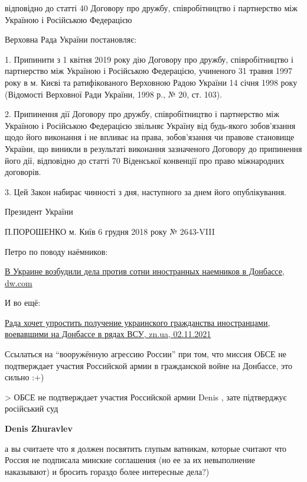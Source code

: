 \begin{itemize}
\begin{itemize}
відповідно до статті 40 Договору про дружбу, співробітництво і партнерство між
Україною і Російською Федерацією

Верховна Рада України постановляє:

1. Припинити з 1 квітня 2019 року дію Договору про дружбу, співробітництво і
партнерство між Україною і Російською Федерацією, учиненого 31 травня 1997 року
в м. Києві та ратифікованого Верховною Радою України 14 січня 1998 року
(Відомості Верховної Ради України, 1998 р., № 20, ст. 103).

2. Припинення дії Договору про дружбу, співробітництво і партнерство між
Україною і Російською Федерацією звільняє Україну від будь-якого зобов’язання
щодо його виконання і не впливає на права, зобов’язання чи правове становище
України, що виникли в результаті виконання зазначеного Договору до припинення
його дії, відповідно до статті 70 Віденської конвенції про право міжнародних
договорів.

3. Цей Закон набирає чинності з дня, наступного за днем його опублікування.

Президент України

П.ПОРОШЕНКО
м. Київ
6 грудня 2018 року
№ 2643-VIII

Петро по поводу наёмников:

\href{https://www.dw.com/ru/v-ukraine-vozbudili-dela-protiv-sotni-naemnikov-v-donbasse/a-54491064}{%
В Украине возбудили дела против сотни иностранных наемников в Донбассе, dw.com%
}


И во ещё:

\href{https://zn.ua/POLITICS/rada-khochet-uprostit-poluchenie-ukrainskoho-hrazhdanstva-dlja-inostrantsev-voevavshikh-na-donbasse-v-rjadakh-vsu.html}{%
Рада хочет упростить получение украинского гражданства иностранцами, воевавшими на Донбассе в рядах ВСУ, zn.ua, 02.11.2021%
}


Ссылаться на \enquote{вооружённую агрессию России} при том, что миссия ОБСЕ не
подтверждает участия Российской армии в гражданской войне на Донбассе, это
сильно :+)


> ОБСЕ не подтверждает участия Российской армии
Denis , зате підтверджує російський суд


\textbf{Denis Zhuravlev} 

а вы считаете что я должен посвятить глупым ватникам, которые считают что
Россия не подписала минские соглашения (но ее за их невыполнение наказывают) и
бросить гораздо более интересные дела?)


\end{itemize}
\end{itemize}

